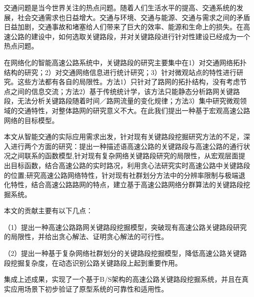 
\begin{cabstract}

		交通问题是当今世界关注的热点问题。随着人们生活水平的提高、交通系统的发展，社会交通需求也日益增大。交通与环境、交通与能源、交通与需求之间的矛盾日益加剧，交通事故和堵塞给人们带来了巨大的效率、能源和生命上的损失。在高速公路的建设中，如何选取关键路段，并对关键路段进行针对性建设已经成为一个热点问题。

		在网络化的智能高速公路系统中，关键路段的研究主要集中在1）对交通网络拓扑结构的研究；2）对交通网络信息进行统计研究；3）针对微观站点的特性进行研究。这些方法都有各自的局限性。方法1）只针对了路网的拓扑结构，没有考虑节点之间的信息交流；方法2）基于传统统计学，该方法只能静态分析路网关键路段，无法分析关键路段随着时间／路网流量的变化规律；方法3）集中研究微观领域的交通特性，对整体路网的研究意义不大。在此我们提出一种基于宏观高速公路网络的目标模型。

		本文从智能交通的实际应用需求出发，针对现有关键路段挖掘研究方法的不足，深入进行两个方面的研究：提出一种描述语高速公路的关键路段与高速公路的通行状况之间联系的函数模型,针对现有复杂网络关键路段研究的局限性，从宏观层面提出目标函数，结合高速公路的实时路况，利用贪心法研究实时高速公路中关键路段的位置;研究高速公路网络特性，针对现有社群划分方法中的分辨率限制与极端退化特性，结合高速公路路网的特点，建立基于高速公路网络分群算法的关键路段挖掘系统。

        本文的贡献主要有以下几点：
        
		（1）提出一种高速公路路网关键路段挖掘模型，突破现有高速公路关键路段研究的局限性，并给出贪心解法、证明贪心解法的可行性。
		
		（2）提出一种基于复杂网络社群划分的关键路段挖掘模型，降低高速公路关键路段挖掘复杂度，在动态识别公路关键路段上起到重要作用。

		集成上述成果，实现了一个基于B/S架构的高速公路关键路段挖掘系统，并且在真实应用场景下初步验证了原型系统的可靠性和适用性。
\end{cabstract}

